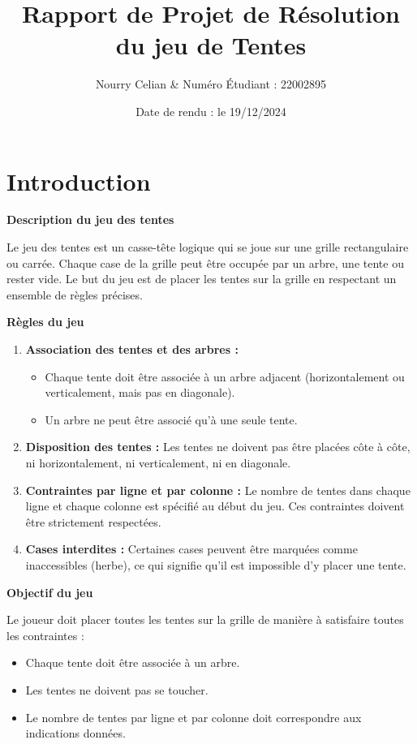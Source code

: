 \documentclass{article}
\title{Rapport de Projet de Résolution du jeu de Tentes}
\author{Nourry Celian & Numéro Étudiant : 22002895}
\date{Date de rendu : le 19/12/2024}
\begin{document}
\maketitle
\section*{Introduction}
\textbf{Description du jeu des tentes}

Le jeu des tentes est un casse-tête logique qui se joue sur une grille rectangulaire ou carrée. Chaque case de la grille peut être occupée par un arbre, une tente ou rester vide. Le but du jeu est de placer les tentes sur la grille en respectant un ensemble de règles précises.

\textbf{Règles du jeu}

\begin{enumerate}
    \item \textbf{Association des tentes et des arbres :}
    \begin{itemize}
        \item Chaque tente doit être associée à un arbre adjacent (horizontalement ou verticalement, mais pas en diagonale).
        \item Un arbre ne peut être associé qu’à une seule tente.
    \end{itemize}
    \item \textbf{Disposition des tentes :}
        Les tentes ne doivent pas être placées côte à côte, ni horizontalement, ni verticalement, ni en diagonale.

    \item \textbf{Contraintes par ligne et par colonne :}
Le nombre de tentes dans chaque ligne et chaque colonne est spécifié au début du jeu. Ces contraintes doivent être strictement respectées.

    \item \textbf{Cases interdites :}
Certaines cases peuvent être marquées comme inaccessibles (herbe), ce qui signifie qu’il est impossible d’y placer une tente.

\end{enumerate}

\textbf{Objectif du jeu}

Le joueur doit placer toutes les tentes sur la grille de manière à satisfaire toutes les contraintes :

\begin{itemize}
    \item Chaque tente doit être associée à un arbre.
    \item Les tentes ne doivent pas se toucher.
    \item Le nombre de tentes par ligne et par colonne doit correspondre aux indications données.
\end{itemize}
\end{document}
